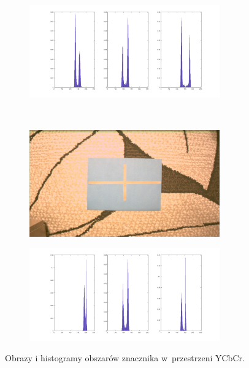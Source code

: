 \begin{figure}
\begin{subfigure}{0.45\textwidth}
		\caption{}
		\label{fig:ycbcr_2}
	\end{subfigure}
	\begin{subfigure}{0.45\textwidth}
		\centering
		\includegraphics[width=0.9\textwidth]{ycbcr_hist2.jpg}
		\caption{}
		\label{fig:ycbcr_hist2}
	\end{subfigure}\\
	\begin{subfigure}{0.45\textwidth}
		\centering
		\includegraphics[width=0.9\textwidth]{ycbcr_jasny.jpg}
		\caption{}
		\label{fig:ycbcr_3}
	\end{subfigure}
	\begin{subfigure}{0.45\textwidth}
		\centering
		\includegraphics[width=0.9\textwidth]{ycbcr_hist3.jpg}
		\caption{}
		\label{fig:ycbcr_hist3}
	\end{subfigure}
	\caption{Obrazy i histogramy obszarów znacznika w~przestrzeni YCbCr.}
	\label{fig:histogramy_ycbcr}
\end{figure}

